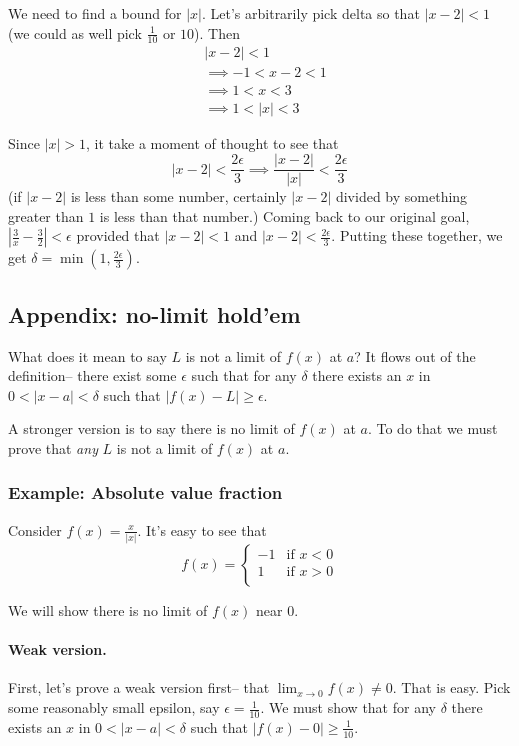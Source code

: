 We need to find a bound for $|x|$. Let's arbitrarily pick delta so that $|x-2|<1$ (we could as well pick $\frac{1}{10}$ or $10$). Then
\begin{align*}
    &|x-2|<1\\
    &\implies -1<x-2<1\\
    &\implies 1<x<3\\
    &\implies 1<|x|<3
\end{align*}

Since $|x|>1$, it take a moment of thought to see that
\[|x-2|<\frac{2\epsilon}{3}\implies\frac{|x-2|}{|x|}<\frac{2\epsilon}{3}\]
(if $|x-2|$ is less than some number, certainly $|x-2|$ divided by something greater than $1$ is less than that number.) Coming back to our original goal, $|\frac{3}{x}-\frac{3}{2}|<\epsilon$ provided that $|x-2|<1$ and $|x-2|<\frac{2\epsilon}{3}$. Putting these together, we get $\delta=\min(1, \frac{2\epsilon}{3})$.

\subsection{Appendix: no-limit hold'em}
What does it mean to say $L$ is not a limit of $f(x)$ at $a$? It flows out of the definition-- there exist some $\epsilon$ such that for any $\delta$ there exists an $x$ in $0<|x-a|<\delta$ such that $|f(x)-L|\geq\epsilon$.

\vs

A stronger version is to say there is no limit of $f(x)$ at $a$. To do that we must prove that \textit{any} $L$ is not a limit of $f(x)$ at $a$.

\subsubsection{Example: Absolute value fraction}
Consider $f(x)=\frac{x}{|x|}$. It's easy to see that
\[f(x)=\begin{cases}
    -1 & \text{if } x<0\\
    1 & \text{if } x>0\\
\end{cases}\]

We will show there is no limit of $f(x)$ near $0$.

\paragraph{Weak version.}

First, let's prove a weak version first-- that $\lim_{x\to 0}f(x)\neq 0$. That is easy. Pick some reasonably small epsilon, say $\epsilon=\frac{1}{10}$. We must show that for any $\delta$ there exists an $x$ in $0<|x-a|<\delta$ such that $|f(x)-0|\geq \frac{1}{10}$.

